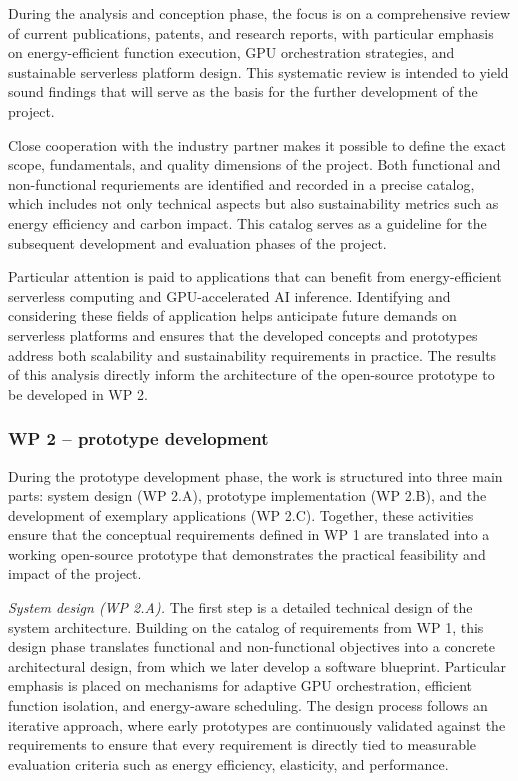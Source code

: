 During the analysis and conception phase, the focus is on a comprehensive review of current publications, patents, and research reports, with particular emphasis on energy-efficient function execution, GPU orchestration strategies, and sustainable serverless platform design.
This systematic review is intended to yield sound findings that will serve as the basis for the further development of the project.

Close cooperation with the industry partner makes it possible to define the exact scope, fundamentals, and quality dimensions of the project.
Both functional and non-functional requriements are identified and recorded in a precise catalog, which includes not only technical aspects but also sustainability metrics such as energy efficiency and carbon impact.
This catalog serves as a guideline for the subsequent development and evaluation phases of the project.

Particular attention is paid to applications that can benefit from energy-efficient serverless computing and GPU-accelerated AI inference.
Identifying and considering these fields of application helps anticipate future demands on serverless platforms and ensures that the developed concepts and prototypes address both scalability and sustainability requirements in practice.
The results of this analysis directly inform the architecture of the open-source prototype to be developed in WP 2.

\subsubsection{WP 2 -- prototype development}

During the prototype development phase, the work is structured into three main parts: system design (WP 2.A), prototype implementation (WP 2.B), and the development of exemplary applications (WP 2.C).
Together, these activities ensure that the conceptual requirements defined in WP 1 are translated into a working open-source prototype that demonstrates the practical feasibility and impact of the project.

\emph{System design (WP 2.A).}
The first step is a detailed technical design of the system architecture.
Building on the catalog of requirements from WP 1, this design phase translates functional and non-functional objectives into a concrete architectural design, from which we later develop a software blueprint.
Particular emphasis is placed on mechanisms for adaptive GPU orchestration, efficient function isolation, and energy-aware scheduling.
The design process follows an iterative approach, where early prototypes are continuously validated against the requirements to ensure that every requirement is directly tied to measurable evaluation criteria such as energy efficiency, elasticity, and performance.

